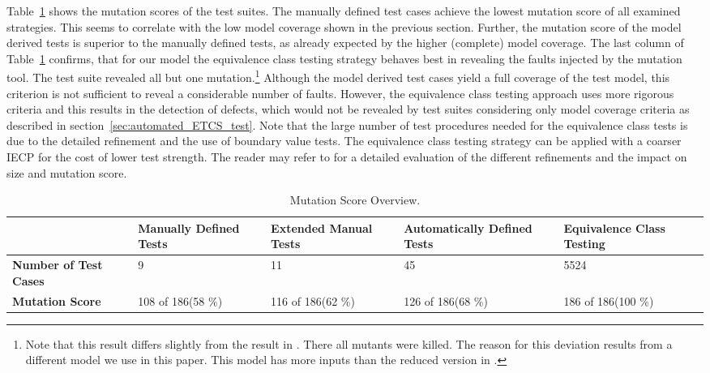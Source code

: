 Table~\ref{tab:mutation} shows the mutation scores of the test suites.
The manually defined test cases achieve the lowest mutation score of all
examined strategies. This seems to correlate with the low model coverage shown in the previous section. 
Further, the mutation score of the model
derived tests is superior to the manually defined tests, as already expected by
the higher (complete) model coverage.
The last column of Table~\ref{tab:mutation} confirms, that for our model
the equivalence class testing strategy behaves best in revealing the faults
injected by the mutation tool.
The test suite revealed all but one mutation.\footnote{Note that this result differs slightly from the result in \cite{huebner15}. There all mutants were killed.
The reason for this deviation results from a different model we use in
this paper. This model has more inputs than the reduced
version in \cite{huebner15}.} Although the model derived test cases yield a full
coverage of the test model, this criterion is not sufficient to reveal a
considerable number of faults. 
However, the equivalence class testing approach uses more rigorous criteria and
this results in the detection of defects, which would not be revealed by test
suites considering only model coverage criteria as described in section~\ref{sec:automated_ETCS_test}. 
Note that the large number of test procedures 
needed for the equivalence class tests is due to the detailed refinement and the use of
boundary value tests. The equivalence class testing strategy can be applied with a coarser
IECP for the cost of lower test strength. The reader may refer to \cite{huebner15} for a detailed evaluation of the different
refinements and the impact on size and mutation score. 

\begin{table}
\caption{Mutation Score Overview.}
\centering
\begin{tabular}{p{40mm}p{18mm}p{18mm}p{24mm}p{18mm}}
\hline\hline
&
{\bf Manually Defined Tests} &
{\bf Extended Manual Tests} &
{\bf Automatically Defined Tests} &
{\bf Equivalence Class Testing}
\\\hline
{\bf Number of Test Cases} &
9 &
11 &
45 &
5524
\\\hline
{\bf Mutation Score}&
108 of 186\newline(58 \%)&
116 of 186\newline(62 \%)&
126 of 186\newline(68 \%)&
186 of 186\newline(100 \%)
\\\hline\hline
\end{tabular}
\label{tab:mutation}
\end{table}%

